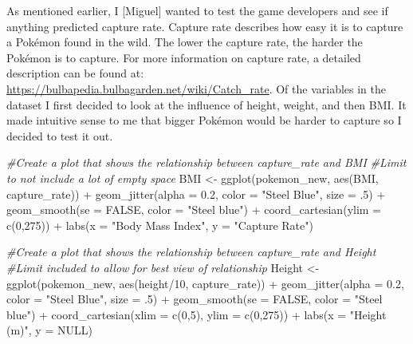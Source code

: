\documentclass[
]{article}
\newenvironment{Shaded}{\begin{snugshade}}{\end{snugshade}}
\newcommand{\AttributeTok}[1]{\textcolor[rgb]{0.77,0.63,0.00}{#1}}
\newcommand{\CommentTok}[1]{\textcolor[rgb]{0.56,0.35,0.01}{\textit{#1}}}
\newcommand{\ConstantTok}[1]{\textcolor[rgb]{0.00,0.00,0.00}{#1}}
\newcommand{\DecValTok}[1]{\textcolor[rgb]{0.00,0.00,0.81}{#1}}
\newcommand{\FloatTok}[1]{\textcolor[rgb]{0.00,0.00,0.81}{#1}}
\newcommand{\FunctionTok}[1]{\textcolor[rgb]{0.00,0.00,0.00}{#1}}
\newcommand{\NormalTok}[1]{#1}
\newcommand{\OtherTok}[1]{\textcolor[rgb]{0.56,0.35,0.01}{#1}}
\newcommand{\SpecialCharTok}[1]{\textcolor[rgb]{0.00,0.00,0.00}{#1}}
\newcommand{\StringTok}[1]{\textcolor[rgb]{0.31,0.60,0.02}{#1}}
\begin{document}
As mentioned earlier, I {[}Miguel{]} wanted to test the game developers
and see if anything predicted capture rate. Capture rate describes how
easy it is to capture a Pokémon found in the wild. The lower the capture
rate, the harder the Pokémon is to capture. For more information on
capture rate, a detailed description can be found at:
\url{https://bulbapedia.bulbagarden.net/wiki/Catch_rate}. Of the
variables in the dataset I first decided to look at the influence of
height, weight, and then BMI. It made intuitive sense to me that bigger
Pokémon would be harder to capture so I decided to test it out.

\begin{Shaded}
\begin{Highlighting}[]
\CommentTok{\#Create a plot that shows the relationship between capture\_rate and BMI}
\CommentTok{\#Limit to not include a lot of empty space}
\NormalTok{BMI }\OtherTok{\textless{}{-}} \FunctionTok{ggplot}\NormalTok{(pokemon\_new, }\FunctionTok{aes}\NormalTok{(BMI, capture\_rate)) }\SpecialCharTok{+}
  \FunctionTok{geom\_jitter}\NormalTok{(}\AttributeTok{alpha =} \FloatTok{0.2}\NormalTok{, }\AttributeTok{color =} \StringTok{"Steel Blue"}\NormalTok{, }\AttributeTok{size =}\NormalTok{ .}\DecValTok{5}\NormalTok{) }\SpecialCharTok{+}
  \FunctionTok{geom\_smooth}\NormalTok{(}\AttributeTok{se =} \ConstantTok{FALSE}\NormalTok{, }\AttributeTok{color =} \StringTok{"Steel blue"}\NormalTok{) }\SpecialCharTok{+}
  \FunctionTok{coord\_cartesian}\NormalTok{(}\AttributeTok{ylim =} \FunctionTok{c}\NormalTok{(}\DecValTok{0}\NormalTok{,}\DecValTok{275}\NormalTok{)) }\SpecialCharTok{+}
  \FunctionTok{labs}\NormalTok{(}\AttributeTok{x =} \StringTok{"Body Mass Index"}\NormalTok{, }\AttributeTok{y =} \StringTok{"Capture Rate"}\NormalTok{)}


\CommentTok{\#Create a plot that shows the relationship between capture\_rate and Height}
\CommentTok{\#Limit included to allow for best view of relationship}
\NormalTok{Height }\OtherTok{\textless{}{-}} \FunctionTok{ggplot}\NormalTok{(pokemon\_new, }\FunctionTok{aes}\NormalTok{(height}\SpecialCharTok{/}\DecValTok{10}\NormalTok{, capture\_rate)) }\SpecialCharTok{+}
  \FunctionTok{geom\_jitter}\NormalTok{(}\AttributeTok{alpha =} \FloatTok{0.2}\NormalTok{, }\AttributeTok{color =} \StringTok{"Steel Blue"}\NormalTok{, }\AttributeTok{size =}\NormalTok{ .}\DecValTok{5}\NormalTok{) }\SpecialCharTok{+}
  \FunctionTok{geom\_smooth}\NormalTok{(}\AttributeTok{se =} \ConstantTok{FALSE}\NormalTok{, }\AttributeTok{color =} \StringTok{"Steel blue"}\NormalTok{) }\SpecialCharTok{+}
  \FunctionTok{coord\_cartesian}\NormalTok{(}\AttributeTok{xlim =} \FunctionTok{c}\NormalTok{(}\DecValTok{0}\NormalTok{,}\DecValTok{5}\NormalTok{), }\AttributeTok{ylim =} \FunctionTok{c}\NormalTok{(}\DecValTok{0}\NormalTok{,}\DecValTok{275}\NormalTok{)) }\SpecialCharTok{+}
  \FunctionTok{labs}\NormalTok{(}\AttributeTok{x =} \StringTok{"Height (m)"}\NormalTok{, }\AttributeTok{y =} \ConstantTok{NULL}\NormalTok{)}
  

\end{Highlighting}
\end{Shaded}
\end{document}
